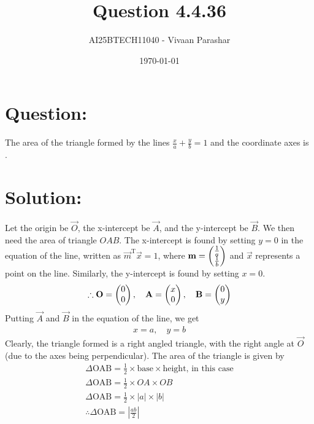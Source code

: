 \documentclass[a4paper, 12pt]{article}
\title{Question 4.4.36}
\author{AI25BTECH11040 - Vivaan Parashar}
\date{\today}
\begin{document}
\maketitle

\section{Question: }
The area of the triangle formed by the lines $\frac{x}{a} + \frac{y}{b} = 1$ and the coordinate axes is \underline{\hspace{2cm}}.

\section{Solution: }
Let the origin be $\vec{O}$, the x-intercept be $\vec{A}$, and the y-intercept be $\vec{B}$. We then need the area of triangle $OAB$.
The x-intercept is found by setting $y=0$ in the equation of the line, written as $\vec{m}^{\mathrm{T}}\vec{x} = 1$, where $\mathbf{m} = \begin{pmatrix}\frac{1}{a} \\ \frac{1}{b}\end{pmatrix}$ and $\vec{x}$ represents a point on the line. Similarly, the y-intercept is found by setting $x=0$.
\begin{align}
    \therefore \mathbf{O} = \begin{pmatrix}0 \\ 0\end{pmatrix}, \quad \mathbf{A} = \begin{pmatrix}x \\ 0\end{pmatrix}, \quad \mathbf{B} = \begin{pmatrix}0 \\ y\end{pmatrix}
\end{align}
Putting $\vec{A}$ and $\vec{B}$ in the equation of the line, we get
\begin{align}
    x = a, \quad y = b
\end{align}
Clearly, the triangle formed is a right angled triangle, with the right angle at $\vec{O}$ (due to the axes being perpendicular). The area of the triangle is given by
\begin{align}
    \Delta\text{OAB} = \frac{1}{2} \times \text{base} \times \text{height},\,\text{in this case}\\
    \Delta\text{OAB} = \frac{1}{2} \times OA \times OB\\
    \Delta\text{OAB} = \frac{1}{2} \times |a| \times |b|\\
    \therefore \Delta\text{OAB} = \left|\frac{ab}{2}\right|
\end{align}
\end{document}
